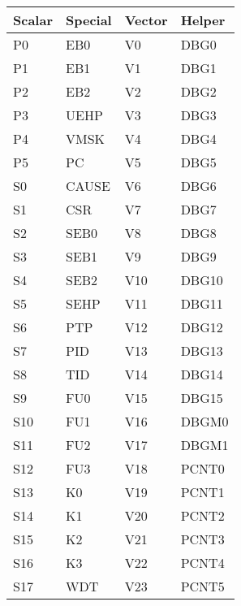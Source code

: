 \begin{table}[hbt!] %

    \begin{center}

    \begin{tabular}{|l|l|l|l|}

        \hline
        Scalar & Special & Vector & Helper \\
        \hline
        \addlinespace[10pt]
        \hline
        P0 & EB0 & V0 & DBG0 \\
        \hline
        P1 & EB1 & V1 & DBG1 \\
        \hline
        P2 & EB2 & V2 & DBG2 \\
        \hline
        P3 & UEHP & V3 & DBG3 \\
        \hline
        P4 & VMSK & V4 & DBG4 \\
        \hline
        P5 & PC & V5 & DBG5 \\
        \hline
        S0 & CAUSE & V6 & DBG6 \\
        \hline
        S1 & CSR & V7 & DBG7 \\
        \hline
        S2 & SEB0 & V8 & DBG8 \\
        \hline
        S3 & SEB1 & V9 & DBG9 \\
        \hline
        S4 & SEB2 & V10 & DBG10 \\
        \hline
        S5 & SEHP & V11 & DBG11 \\
        \hline
        S6 & PTP & V12 & DBG12 \\
        \hline
        S7 & PID & V13 & DBG13 \\
        \hline
        S8 & TID & V14 & DBG14 \\
        \hline
        S9 & FU0 & V15 & DBG15 \\
        \hline
        S10 & FU1 & V16 & DBGM0 \\
        \hline
        S11 & FU2 & V17 & DBGM1 \\
        \hline
        S12 & FU3 & V18 & PCNT0 \\
        \hline
        S13 & K0 & V19 & PCNT1 \\
        \hline
        S14 & K1 & V20 & PCNT2 \\
        \hline
        S15 & K2 & V21 & PCNT3 \\
        \hline
        S16 & K3 & V22 & PCNT4 \\
        \hline
        S17 & WDT & V23 & PCNT5 \\
        \hline

\end{tabular}
\end{center}
\end{table}
